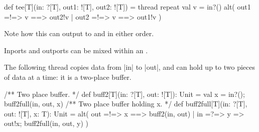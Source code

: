 \documentclass[notes,color]{sepslide0}
\begin{document}

\begin{slide}

\begin{scala}
def tee[T](in: ?[T], out1: ![T], out2: ![T]) = thread{
  repeat{ 
    val v = in?()
    alt( out1 =!=> { v } ==> { out2!v }
       | out2 =!=> { v } ==> { out1!v }
    )
  }
}
\end{scala}
%
Note how this can output to  and  in either order.
\end{slide}


\begin{slide}

Inports and outports can be mixed within an .

The following thread copies data from |in| to |out|, and can hold up to two
pieces of data at a time: it is a two-place buffer.
%
\begin{scala}  
  /** Two place buffer. */
  def buff2[T](in: ?[T], out: ![T]): Unit = {
    val x = in?(); buff2full(in, out, x)
  }
  /** Two place buffer holding x. */
  def buff2full[T](in: ?[T], out: ![T], x: T): Unit = {
    alt(
      out =!=> { x } ==> { buff2(in, out) }
      | in =?=> { y => out!x; buff2full(in, out, y) }
    )
  }  
\end{scala}

\end{slide}

\end{document}
